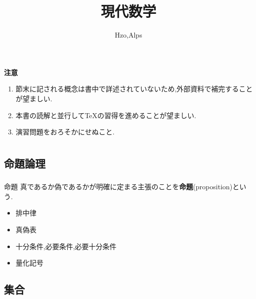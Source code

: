 \documentclass[dvipdfmx,b4j]{jsarticle}
\begin{document}
\title{現代数学}
\author{Hzo,Alps}

\maketitle

\begin{framed}
\textbf{注意}
\begin{enumerate}
    \item 節末に記される概念は書中で詳述されていないため,外部資料で補完することが望ましい.
    \item 本書の読解と並行して\TeX の習得を進めることが望ましい.
    \item 演習問題をおろそかにせぬこと.
\end{enumerate}
\end{framed}
\tableofcontents

\section{}
\subsection{命題論理}
\subsubsection{}
\begin{definition}{命題}{}
真であるか偽であるかが明確に定まる主張のことを\textbf{命題}(proposition)という.
\end{definition}
\begin{itemize}
  \item 排中律
  \item 真偽表
  \item 十分条件,必要条件,必要十分条件
  \item 量化記号
\end{itemize}

\subsection{集合}
\subsubsection{}
\end{document}

